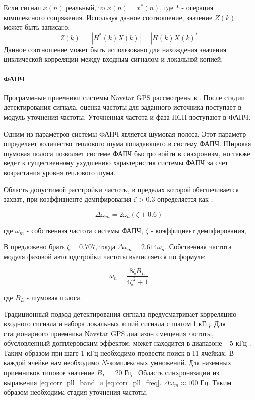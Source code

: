 Если сигнал $x(n)$ реальный, то $x(n) = x^*(n)$, где ${*}$ - операция комплексного сопряжения. Используя данное соотношение,
значение $Z(k)$ может быть записано:
\begin{equation}
	\label{eq:fft_magnitude}
	|Z(k)|=|H^*(k)X(k)|=|H(k)X(k)^*|
\end{equation}
Данное соотношение может быть использовано для нахождения значения циклической корреляции между входным сигналом и 
локальной копией.

\paragraph{ФАПЧ}
Программные приемники системы Navstar GPS рассмотрены в \cite{tsui, akos-book}.
После стадии детектирования сигнала, оценка частоты для заданного источника поступает в модуль уточнения частоты.
Уточненная частота и фаза ПСП поступают в ФАПЧ.

Одним из параметров системы ФАПЧ является шумовая полоса.
Этот параметр определяет количество теплового шума попадающего в систему ФАПЧ. Широкая шумовая полоса позволяет системе ФАПЧ быстро войти в синхронизм,
но также ведет к существенному ухудшению характеристик системы ФАПЧ за счет возрастания уровня теплового шума.

Область допустимой расстройки частоты, в пределах которой обеспечивается захват, при коэффициенте демпфирования ${\zeta>0.3}$ определяется как
\cite{spilker-book}:
\begin{center}
\begin{equation}
	\label{eq:corr_pll_band}
	\Delta \omega_m = 2 \omega_n (\zeta + 0.6)
\end{equation}
\end{center}
где ${\omega_m}$ - собственная частота системы ФАПЧ, ${\zeta}$ - коэффициент демпфирования,

В \cite{tsui, spilker-book} предложено брать ${\zeta=0.707}$, тогда ${\Delta \omega_m = 2.614 \omega_n}$.
Собственная частота модуля фазовой автоподстройки частоты вычисляется по формуле:
\begin{center}
\begin{equation}
	\label{eq:corr_pll_freq}
	\omega_n = \frac{8 \zeta B_L}{4 \zeta^2 + 1} 
\end{equation}
\end{center}
где ${B_L}$ - шумовая полоса.

Традиционный подход детектирования сигнала предусматривает корреляцию входного сигнала и набора локальных копий сигнала с шагом 1 кГц.
Для стационарного приемника Navstar GPS диапазон смещения частоты, обусловленный допплеровским эффектом, может находится в диапазоне
${\pm 5}$ кГц \cite{tsui}.  Таким образом при шаге 1 кГц необходимо провести поиск в 11 ячейках. В каждой ячейке нам необходимо ${N}$-комплексных умножений.
Для наземных приемников типовое значение  ${B_L=20}$ Гц \cite{tsui, akos-book}. Область синхронизации из выражения \ref{eq:corr_pll_band} и 
\ref{eq:corr_pll_freq}.
${\Delta \omega_m \approx 100}$ Гц. Таким образом необходима стадия уточнения частоты.

